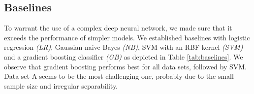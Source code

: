 \documentclass[acmsmall,nonacm]{acmart}
\begin{document}
\subsection{Baselines} \label{ssec:baselines}

To warrant the use of a complex deep neural network, we made sure that it exceeds the performance of simpler models. We established baselines with logistic regression \textit{(LR)}, Gaussian naive Bayes \textit{(NB)}, SVM with an RBF kernel \textit{(SVM)} and a gradient boosting classifier \textit{(GB)} as depicted in Table \ref{tab:baselines}. We observe that gradient boosting performs best for all data sets, followed by SVM. Data set A seems to be the most challenging one, probably due to the small sample size and irregular separability.

\begin{table}[]
\caption{Results of baseline models}
\label{tab:baselines}
\end{table}
\end{document}
